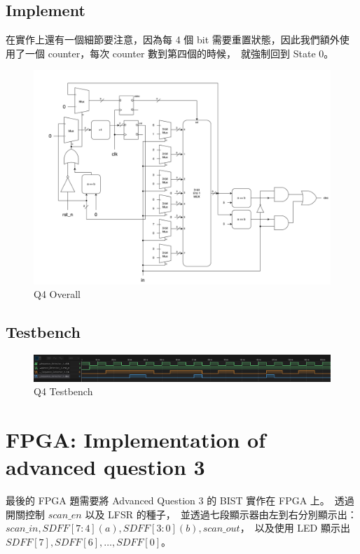 \documentclass[10.5pt,compsoc,UTF8]{CjC}
\theoremstyle{mystyle}
\begin{document}
\newpage
\subsection{Implement}

在實作上還有一個細節要注意，因為每 4 個 bit 需要重置狀態，因此我們額外使用了一個 counter，每次 counter 數到第四個的時候，\
就強制回到 State 0。

\begin{figure}[h!]
  \centering
  \includegraphics[width=\textwidth]{./img/Q4.png}
  \caption{Q4 Overall}
  \label{fig:Q4-Overall}
\end{figure}


\subsection{Testbench}

\begin{figure}[h!]
  \centering
  \includegraphics[width=\textwidth]{./img/Q4-tb.png}
  \caption{Q4 Testbench}
  \label{fig:Q4-tb}
\end{figure}

\section{FPGA: Implementation of advanced question 3}

最後的 FPGA 題需要將 Advanced Question 3 的 BIST 實作在 FPGA 上。\
透過開關控制 $scan\_en$ 以及 LFSR 的種子，\
並透過七段顯示器由左到右分別顯示出：$scan\_in, SDFF[7:4] (a), SDFF[3:0] (b), scan\_out$，\
以及使用 LED 顯示出 $SDFF[7], SDFF[6], \dots, SDFF[0]$。
\newpage
\end{document}
